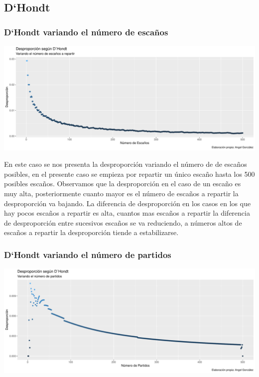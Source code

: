 \documentclass[12pt,a4paper,]{book}
\numberwithin{dummy}{section}
\theoremstyle{ocrenumbox}
\theoremstyle{blacknumex}
\theoremstyle{blacknumbox}
\theoremstyle{ocrenum}
\theoremstyle{ocrenum}
\begin{document}
\hypertarget{dhondt}{%
\subsection{D`Hondt}\label{dhondt}}

\hypertarget{dhondt-variando-el-nuxfamero-de-escauxf1os}{%
\subsubsection{D`Hondt variando el número de
escaños}\label{dhondt-variando-el-nuxfamero-de-escauxf1os}}

\begin{center}\includegraphics[width=0.95\linewidth]{figurasR/unnamed-chunk-9-1} \end{center}

En este caso se nos presenta la desproporción variando el número de de
escaños posibles, en el presente caso se empieza por repartir un único
escaño hasta los 500 posibles escaños. Observamos que la desproporción
en el caso de un escaño es muy alta, posteriormente cuanto mayor es el
número de escaños a repartir la desproporción va bajando. La diferencia
de desproporción en los casos en los que hay pocos escaños a repartir es
alta, cuantos mas escaños a repartir la diferencia de desproporción
entre sucesivos escaños se va reduciendo, a números altos de escaños a
repartir la desproporción tiende a estabilizarse.

\hypertarget{dhondt-variando-el-nuxfamero-de-partidos}{%
\subsubsection{D`Hondt variando el número de
partidos}\label{dhondt-variando-el-nuxfamero-de-partidos}}

\begin{center}\includegraphics[width=0.95\linewidth]{figurasR/unnamed-chunk-10-1} \end{center}
\end{document}
